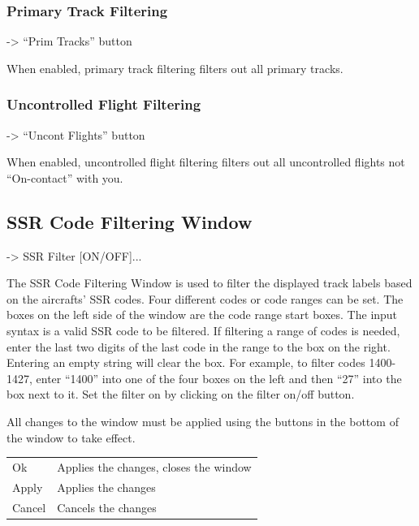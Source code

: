 \documentclass[a4paper,oneside,11pt]{memoir}
\begin{document}
\bigskip

\subsubsection{Primary Track Filtering}\label{func:filterpri}

 -> “Prim Tracks” button

When enabled, primary track filtering filters out all primary tracks.

\subsubsection{Uncontrolled Flight Filtering}\label{func:filterunc}

 -> “Uncont Flights” button

When enabled, uncontrolled flight filtering filters out all uncontrolled flights not “On-contact” with you.

\subsection{SSR Code Filtering Window}
\label{win:ssr}

 -> SSR Filter [ON/OFF]...

\bigskip


The SSR Code Filtering Window is used to filter the displayed track labels based on the aircrafts’ SSR codes. Four different codes or code ranges can be set. The boxes on the left side of the window are the code range start boxes. The input syntax is a valid SSR code to be filtered. If filtering a range of codes is needed, enter the last two digits of the last code in the range to the box on the right. Entering an empty string will clear the box. For example, to filter codes 1400-1427, enter “1400” into one of the four boxes on the left and then “27” into the box next to it. Set the filter on by clicking on the filter on/off button.

\bigskip

All changes to the window must be applied using the buttons in the bottom of the window to take effect.

\bigskip

\begin{longtable}{p{2.5cm} p{10cm}}
    Ok      & Applies the changes, closes the window\\
    Apply   & Applies the changes\\
    Cancel  & Cancels the changes\\
\end{longtable}
\end{document}
